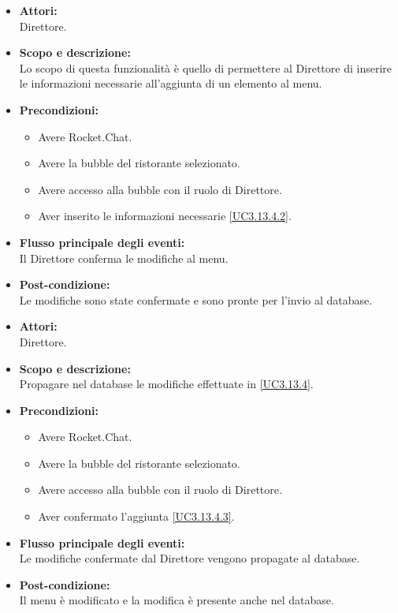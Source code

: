 
\begin{itemize}
	\item \textbf{Attori:}
	\\Direttore.
	\item \textbf{Scopo e descrizione:} 
	\\Lo scopo di questa funzionalità è quello di permettere al Direttore di inserire le informazioni necessarie all'aggiunta di un elemento al menu.
	\item \textbf{Precondizioni:}
	\begin{itemize}
		\item Avere Rocket.Chat.
		\item Avere la bubble del ristorante selezionato.
		\item Avere accesso alla bubble con il ruolo di Direttore.
		\item Aver inserito le informazioni necessarie \ref{UC3.13.4.2}.
	\end{itemize}
	\item \textbf{Flusso principale degli eventi:}
	\\Il Direttore conferma le modifiche al menu.
	\item \textbf{Post-condizione:}
	\\Le modifiche sono state confermate e sono pronte per l'invio al database.
\end{itemize}


\begin{itemize}
	\item \textbf{Attori:}
	\\Direttore.
	\item \textbf{Scopo e descrizione:} 
	\\Propagare nel database le modifiche effettuate in \ref{UC3.13.4}.
	\item \textbf{Precondizioni:}
	\begin{itemize}
		\item Avere Rocket.Chat.
		\item Avere la bubble del ristorante selezionato.
		\item Avere accesso alla bubble con il ruolo di Direttore.
		\item Aver confermato l'aggiunta \ref{UC3.13.4.3}.
	\end{itemize}
	\item \textbf{Flusso principale degli eventi:}
	\\Le modifiche confermate dal Direttore vengono propagate al database.
	\item \textbf{Post-condizione:}
	\\Il menu è modificato e la modifica è presente anche nel database.
\end{itemize}

